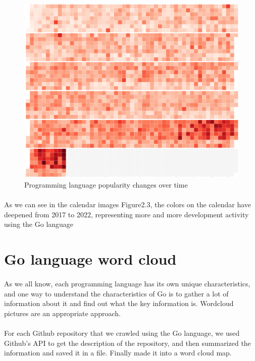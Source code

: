 \documentclass[11pt,onside,a4paper,fleqn]{report}
\begin{document}
\begin{figure}[]
\centering
\includegraphics[scale=0.4]{result/commits.png}
\caption{Programming language popularity changes over time}
\label{fig:pathdemo4}
\end{figure}

\paragraph{} As we can see in the calendar images Figure2.3, the colors on the calendar have deepened from 2017 to 2022, representing more and more development activity using the Go language

\section{Go language word cloud}

\paragraph{} As we all know, each programming language has its own unique characteristics, and one way to understand 
the characteristics of Go is to gather a lot of information about it and find out what the key information is. 
Wordcloud pictures are an appropriate approach.


\paragraph{} For each Github repository that we crawled using the Go language, we used Github's API to get the description 
of the repository, and then summarized the information and saved it in a file. Finally made it into a word cloud map.
\end{document}
